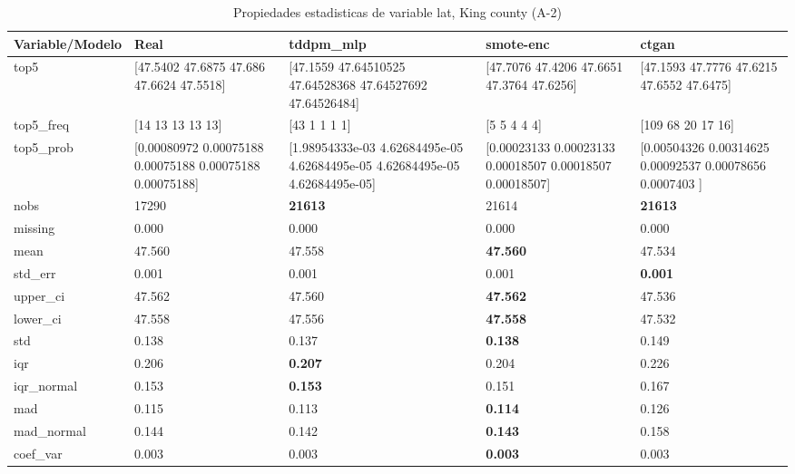 \begin{table}[H]
\centering
\fontsize{8}{14}\selectfont
\caption{Propiedades  estadisticas de variable lat, King county (A-2)}
\label{table-stats-king county-a-2-lat}
\begin{tabular}{|l|m{10em}|m{10em}|m{10em}|m{10em}|}
\hline
 \rowcolor[gray]{0.8}
Variable/Modelo & Real & tddpm\_mlp & smote-enc & ctgan \\
\hline top5 & [47.5402 47.6875 47.686  47.6624 47.5518] & [47.1559     47.64510525 47.64528368 47.64527692 47.64526484] & [47.7076 47.4206 47.6651 47.3764 47.6256] & [47.1593 47.7776 47.6215 47.6552 47.6475] \\
\hline top5\_freq & [14 13 13 13 13] & [43  1  1  1  1] & [5 5 4 4 4] & [109  68  20  17  16] \\
\hline top5\_prob & [0.00080972 0.00075188 0.00075188 0.00075188 0.00075188] & [1.98954333e-03 4.62684495e-05 4.62684495e-05 4.62684495e-05
 4.62684495e-05] & [0.00023133 0.00023133 0.00018507 0.00018507 0.00018507] & [0.00504326 0.00314625 0.00092537 0.00078656 0.0007403 ] \\
\hline nobs & 17290 & \bfseries 21613 & \cellcolor[rgb]{0.9, 0.54, 0.52} 21614 & \bfseries 21613 \\
\hline missing & 0.000 & 0.000 & 0.000 & 0.000 \\
\hline mean & 47.560 & 47.558 & \bfseries 47.560 & \cellcolor[rgb]{0.9, 0.54, 0.52} 47.534 \\
\hline std\_err & 0.001 & \cellcolor[rgb]{0.9, 0.54, 0.52} 0.001 & 0.001 & \bfseries 0.001 \\
\hline upper\_ci & 47.562 & 47.560 & \bfseries 47.562 & \cellcolor[rgb]{0.9, 0.54, 0.52} 47.536 \\
\hline lower\_ci & 47.558 & 47.556 & \bfseries 47.558 & \cellcolor[rgb]{0.9, 0.54, 0.52} 47.532 \\
\hline std & 0.138 & 0.137 & \bfseries 0.138 & \cellcolor[rgb]{0.9, 0.54, 0.52} 0.149 \\
\hline iqr & 0.206 & \bfseries 0.207 & 0.204 & \cellcolor[rgb]{0.9, 0.54, 0.52} 0.226 \\
\hline iqr\_normal & 0.153 & \bfseries 0.153 & 0.151 & \cellcolor[rgb]{0.9, 0.54, 0.52} 0.167 \\
\hline mad & 0.115 & 0.113 & \bfseries 0.114 & \cellcolor[rgb]{0.9, 0.54, 0.52} 0.126 \\
\hline mad\_normal & 0.144 & 0.142 & \bfseries 0.143 & \cellcolor[rgb]{0.9, 0.54, 0.52} 0.158 \\
\hline coef\_var & 0.003 & 0.003 & \bfseries 0.003 & \cellcolor[rgb]{0.9, 0.54, 0.52} 0.003 \\

\end{tabular}
\end{table}
